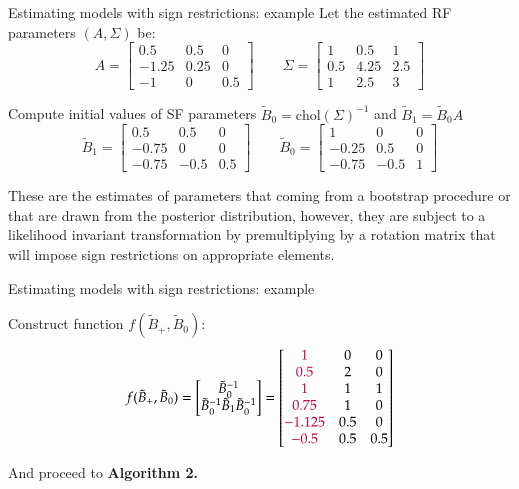\documentclass[notes,blackandwhite,mathsans,usenames,dvipsnames]{beamer}
\begin{document}
\begin{frame}{Estimating models with sign restrictions: example}
\small
{\color{mcxs2}Let the estimated RF parameters} $(A,\Sigma)$ {\color{mcxs2}be:}\footnotesize
$$A = \begin{bmatrix}0.5 & 0.5 &  0 \\-1.25& 0.25&  0\\-1& 0&  0.5\end{bmatrix}\qquad
\Sigma=\begin{bmatrix}1& 0.5&  1\\0.5& 4.25&  2.5\\1& 2.5&  3\end{bmatrix}$$

\small {\color{mcxs2}Compute initial values of SF parameters} $\tilde{B}_0=\text{chol}(\Sigma)^{-1}$ {\color{mcxs2}and} $\tilde{B}_1=\tilde{B}_0A$\footnotesize
$$\tilde{B}_1 = \begin{bmatrix}0.5&  0.5 & 0\\-0.75 & 0&  0\\-0.75& -0.5&  0.5\end{bmatrix}\qquad
\tilde{B}_0 = \begin{bmatrix}1& 0&  0\\-0.25&  0.5& 0\\-0.75& -0.5&1\end{bmatrix}$$

\smallskip\small {\color{mcxs2}These are the estimates of parameters that coming from a bootstrap procedure or that are drawn from the posterior distribution, however, they are subject to a likelihood invariant transformation by premultiplying by a rotation matrix  that will impose sign restrictions on appropriate elements.}

\end{frame}





\begin{frame}{Estimating models with sign restrictions: example}

{\color{mcxs2}Construct function} $f(\tilde{B}_+,\tilde{B}_0)$:
$$f(\tilde{B}_+,\tilde{B}_0) = \begin{bmatrix}\tilde{B}_0^{-1}\\ \tilde{B}_0^{-1}\tilde{B}_1\tilde{B}_0^{-1}\end{bmatrix}=
\begin{bmatrix} {\color{purple}1}&0&0\\{\color{purple}0.5}&2&0\\{\color{purple}1}&1&1\\{\color{purple}0.75}&1&0\\{\color{purple}-1.125}&0.5&0\\{\color{purple}-0.5}&0.5&0.5 \end{bmatrix}$$

{\color{mcxs2}And proceed to} \textbf{Algorithm 2.}

\end{frame}
\end{document}
